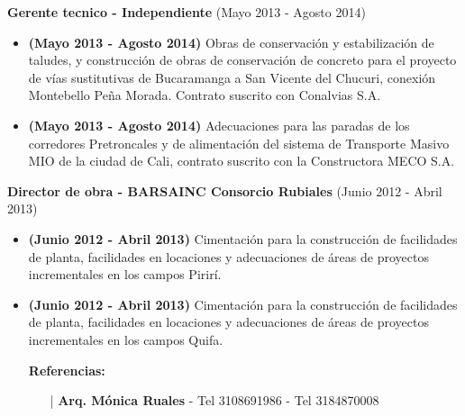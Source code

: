 \documentclass[letterpaper,10pt]{article}
\begin{document}
  \vspace*{0.1cm}
  \textbf{Gerente tecnico - Independiente} (Mayo 2013 - Agosto 2014)
  \hfill
  \vspace*{0.1cm}
  \begin{minipage}{\linewidth}
    \begin{itemize}[noitemsep]
      \item \textbf{(Mayo 2013 - Agosto 2014)} Obras de conservación y estabilización de taludes, y construcción de obras de conservación de concreto para el proyecto de vías sustitutivas de Bucaramanga a San Vicente del Chucuri, conexión Montebello Peña Morada. Contrato suscrito con Conalvias S.A.
      \item \textbf{(Mayo 2013 - Agosto 2014)} Adecuaciones para las paradas de los corredores Pretroncales y de alimentación del sistema de Transporte Masivo MIO de la ciudad de Cali, contrato suscrito con la Constructora MECO S.A.
    \end{itemize}
    \hfill
  \end{minipage}

  \vspace*{0.1cm}
  \textbf{Director de obra - BARSAINC Consorcio Rubiales} (Junio 2012 - Abril 2013)
  \hfill
  \vspace*{0.1cm}
  \begin{minipage}{\linewidth}
    \begin{itemize}[noitemsep]
      \item \textbf{(Junio 2012 - Abril 2013)} Cimentación para la construcción de facilidades de planta, facilidades en locaciones y adecuaciones de áreas de proyectos incrementales en los campos Pirirí.
      \item \textbf{(Junio 2012 - Abril 2013)} Cimentación para la construcción de facilidades de planta, facilidades en locaciones y adecuaciones de áreas de proyectos incrementales en los campos Quifa.
      \item [] \textbf{Referencias:}
      \begin{itemize}[noitemsep]
        \vspace*{-0.2cm}
        \item [|] \textbf{Arq. Mónica Ruales} - Tel 3108691986 - Tel 3184870008
      \end{itemize}
    \end{itemize}
    \hfill
  \end{minipage}
  
\end{document}
